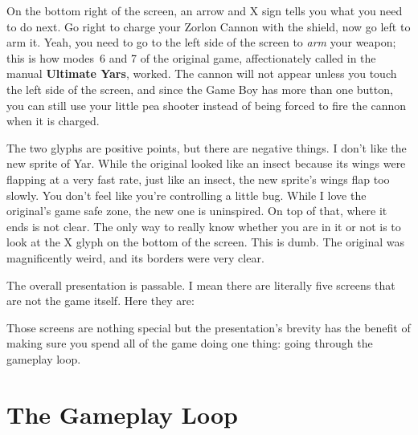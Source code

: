 \documentclass{book}
\let\oldcenter\center
\let\oldendcenter\endcenter
\renewenvironment{center}{\setlength\topsep{0pt}\oldcenter}{\oldendcenter}
\begin{document}
On the bottom right of the screen, an arrow and X sign tells you what you need to do next. Go right to charge your Zorlon Cannon with the shield, now go left to arm it. Yeah, you need to go to the left side of the screen to \emph{arm} your weapon; this is how modes 6 and 7 of the original game, affectionately called in the manual \textbf{Ultimate Yars}, worked. The cannon will not appear unless you touch the left side of the screen, and since the Game Boy has more than one button, you can still use your little pea shooter instead of being forced to fire the cannon when it is charged.

The two glyphs are positive points, but there are negative things. I don’t like the new sprite of Yar. While the original looked like an insect because its wings were flapping at a very fast rate, just like an insect, the new sprite’s wings flap too slowly. You don’t feel like you’re controlling a little bug. While I love the original’s game safe zone, the new one is uninspired. On top of that, where it ends is not clear. The only way to really know whether you are in it or not is to look at the X glyph on the bottom of the screen. This is dumb. The original was magnificently weird, and its borders were very clear.

The overall presentation is passable. I mean there are literally five screens that are not the game itself. Here they are:

\begin{center}
\vspace{8pt}
\quad\vspace{4pt}
\quad\vspace{4pt}
\quad\vspace{4pt}
\quad\vspace{4pt}
\end{center}

Those screens are nothing special but the presentation’s brevity has the benefit of making sure you spend all of the game doing one thing: going through the gameplay loop.

\FloatBarrier\needspace{5pt}\section*{The Gameplay Loop}\nopagebreak[4]
\end{document}

